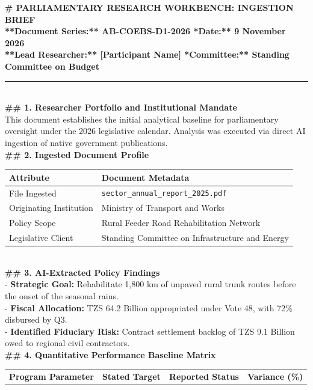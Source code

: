 \documentclass[11pt, a4paper]{report}
\begin{document}
\begin{tcolorbox}[colback=lightgrey, colframe=bordergrey, title=\textbf{Deliverable 1 Preview: \texttt{Day1\_Ingestion\_Brief.md}}]
\small
\textbf{\# PARLIAMENTARY RESEARCH WORKBENCH: INGESTION BRIEF}\\
\textbf{**Document Series:** AB-COEBS-D1-2026 \quad \textbar{} \quad **Date:** 9 November 2026}\\
\textbf{**Lead Researcher:** [Participant Name] \quad \textbar{} \quad **Committee:** Standing Committee on Budget}\\[0.2cm]
\rule{\textwidth}{0.4pt}\\[0.2cm]
\textbf{\#\# 1. Researcher Portfolio and Institutional Mandate}\\
This document establishes the initial analytical baseline for parliamentary oversight under the 2026 legislative calendar. Analysis was executed via direct AI ingestion of native government publications.\\[0.2cm]
\textbf{\#\# 2. Ingested Document Profile}\\
\begin{tabular}{ll}
\toprule
\textbf{Attribute} & \textbf{Document Metadata} \\
\midrule
File Ingested & \texttt{sector\_annual\_report\_2025.pdf} \\
Originating Institution & Ministry of Transport and Works \\
Policy Scope & Rural Feeder Road Rehabilitation Network \\
Legislative Client & Standing Committee on Infrastructure and Energy \\
\bottomrule
\end{tabular}\\[0.2cm]
\textbf{\#\# 3. AI-Extracted Policy Findings}\\
- \textbf{Strategic Goal:} Rehabilitate 1,800 km of unpaved rural trunk routes before the onset of the seasonal rains.\\
- \textbf{Fiscal Allocation:} TZS 64.2 Billion appropriated under Vote 48, with 72\% disbursed by Q3.\\
- \textbf{Identified Fiduciary Risk:} Contract settlement backlog of TZS 9.1 Billion owed to regional civil contractors.\\[0.2cm]
\textbf{\#\# 4. Quantitative Performance Baseline Matrix}\\
\begin{tabular}{lrrr}
\toprule
\textbf{Program Parameter} & \textbf{Stated Target} & \textbf{Reported Status} & \textbf{Variance (\%)} \\

\end{tabular}
\end{tcolorbox}
\end{document}
